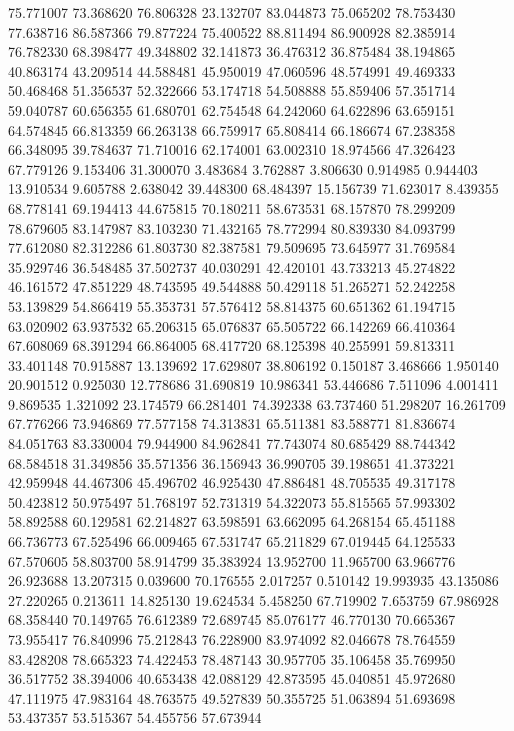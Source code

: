 75.771007
73.368620
76.806328
23.132707
83.044873
75.065202
78.753430
77.638716
86.587366
79.877224
75.400522
88.811494
86.900928
82.385914
76.782330
68.398477
49.348802
32.141873
36.476312
36.875484
38.194865
40.863174
43.209514
44.588481
45.950019
47.060596
48.574991
49.469333
50.468468
51.356537
52.322666
53.174718
54.508888
55.859406
57.351714
59.040787
60.656355
61.680701
62.754548
64.242060
64.622896
63.659151
64.574845
66.813359
66.263138
66.759917
65.808414
66.186674
67.238358
66.348095
39.784637
71.710016
62.174001
63.002310
18.974566
47.326423
67.779126
9.153406
31.300070
3.483684
3.762887
3.806630
0.914985
0.944403
13.910534
9.605788
2.638042
39.448300
68.484397
15.156739
71.623017
8.439355
68.778141
69.194413
44.675815
70.180211
58.673531
68.157870
78.299209
78.679605
83.147987
83.103230
71.432165
78.772994
80.839330
84.093799
77.612080
82.312286
61.803730
82.387581
79.509695
73.645977
31.769584
35.929746
36.548485
37.502737
40.030291
42.420101
43.733213
45.274822
46.161572
47.851229
48.743595
49.544888
50.429118
51.265271
52.242258
53.139829
54.866419
55.353731
57.576412
58.814375
60.651362
61.194715
63.020902
63.937532
65.206315
65.076837
65.505722
66.142269
66.410364
67.608069
68.391294
66.864005
68.417720
68.125398
40.255991
59.813311
33.401148
70.915887
13.139692
17.629807
38.806192
0.150187
3.468666
1.950140
20.901512
0.925030
12.778686
31.690819
10.986341
53.446686
7.511096
4.001411
9.869535
1.321092
23.174579
66.281401
74.392338
63.737460
51.298207
16.261709
67.776266
73.946869
77.577158
74.313831
65.511381
83.588771
81.836674
84.051763
83.330004
79.944900
84.962841
77.743074
80.685429
88.744342
68.584518
31.349856
35.571356
36.156943
36.990705
39.198651
41.373221
42.959948
44.467306
45.496702
46.925430
47.886481
48.705535
49.317178
50.423812
50.975497
51.768197
52.731319
54.322073
55.815565
57.993302
58.892588
60.129581
62.214827
63.598591
63.662095
64.268154
65.451188
66.736773
67.525496
66.009465
67.531747
65.211829
67.019445
64.125533
67.570605
58.803700
58.914799
35.383924
13.952700
11.965700
63.966776
26.923688
13.207315
0.039600
70.176555
2.017257
0.510142
19.993935
43.135086
27.220265
0.213611
14.825130
19.624534
5.458250
67.719902
7.653759
67.986928
68.358440
70.149765
76.612389
72.689745
85.076177
46.770130
70.665367
73.955417
76.840996
75.212843
76.228900
83.974092
82.046678
78.764559
83.428208
78.665323
74.422453
78.487143
30.957705
35.106458
35.769950
36.517752
38.394006
40.653438
42.088129
42.873595
45.040851
45.972680
47.111975
47.983164
48.763575
49.527839
50.355725
51.063894
51.693698
53.437357
53.515367
54.455756
57.673944
